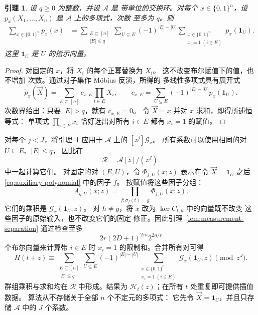 \documentclass[11pt,reqno]{amsart}
\numberwithin{equation}{section}
\newtheorem{lemma}[theorem]{引理}
\theoremstyle{definition}\newtheorem{definition}[theorem]{定义}
\theoremstyle{remark}\newtheorem{remark}[theorem]{注}
\renewcommand{\le}{\leqslant}
\renewcommand{\ge}{\geqslant}
\begin{document}
\begin{lemma}\label{lem:boolean-differences}
设 $q\ge0$ 为整数，并设 $\mathcal A$ 是
带单位的交换环。对每个 $x\in\{0,1\}^n$，设
$p_x(X_1,\ldots,X_n)$ 是 $\mathcal A$ 上的多项式，次数
至多为 $q$。则
\begin{align}
 \sum_{x\in\{0,1\}^n}p_x(x)
 &=\sum_{\substack{E\subseteq[n]\\|E|\le q}}
   \sum_{U\subseteq E}(-1)^{|E|-|U|}
   \sum_{\substack{x\in\{0,1\}^n\\x_i=1\ (i\in E)}}
                  p_x(\mathbf1_U).
\label{eq:boolean-differences}
\end{align}
这里 $\mathbf1_U$ 是 $U$ 的指示向量。
\end{lemma}
\begin{proof}
对固定的 $x$，将 $X_i$ 的每个正幂替换为 $X_i$。
这不改变布尔赋值下的值，也不增加
次数。通过对子集作 M\"obius 反演，所得的
多线性多项式具有展开式
\[
 \widetilde p_x(\vec{X})=\sum_{E\subseteq[n]}c_{x,E}\prod_{i\in E}X_i,
 \qquad
 c_{x,E}=\sum_{U\subseteq E}(-1)^{|E|-|U|}p_x(\mathbf1_U).
\]
次数界给出：只要 $|E|>q$，就有 $c_{x,E}=0$。
令 $\vec{X}=x$ 并对 $x$ 求和，即得所述恒等式：
单项式 $\prod_{i\in E}x_i$
恰好选出对所有 $i\in E$ 都有 $x_i=1$ 的赋值。
\end{proof}

对每个 $j<J$，将引理~\ref{lem:boolean-differences} 应用于
$\mathcal A$ 上的 $[z^j]\mathcal G_x$。
所有系数可以使用相同的对 $U\subseteq E$、$|E|\le q$，
因此在
\[
 \mathcal R=\mathcal A[z]/(z^J).
\]
中一起计算它们。
对固定的对 $(E,U)$，令 $\Phi_{f,U}(x;z)$ 表示在令 $\vec X=\mathbf1_U$ 之后
\eqref{eq:auxiliary-polynomial} 中的因子 $f$。
按赋值将这些因子分组：
\begin{equation}\label{eq:group-polynomial}
 A_{g,U}(x;z)=\prod_{f:\sigma_f(t)=g}\Phi_{f,U}(x;z).
\end{equation}
它们的乘积是 $\mathcal G_x(\mathbf1_U,z)$。
对 $h\ne g$，将 $x$ 改为 $\ker C_{t,h}$ 中的向量既不改变
这些因子的原始输入，也不改变它们的固定
修正。因此引理~\ref{lem:measurement-separation}
通过检查至多
\begin{equation}\label{eq:boolean-enumeration}
 2r(2D+1)^{2\tau n}2^{2n/r}
\end{equation}
个布尔向量来计算带 $i\in E$ 时 $x_i=1$ 的限制和。合并所有对可得
\begin{equation}\label{eq:full-taylor-sum}
 H(t+z)\equiv
 \sum_{\substack{E\subseteq[n]\\|E|\le q}}
 \sum_{U\subseteq E}(-1)^{|E|-|U|}
 \sum_{\substack{x\in\{0,1\}^n\\x_i=1\ (i\in E)}}
       \mathcal G_x(\mathbf1_U,z)\pmod{z^J}.
\end{equation}
群组乘积与求和均在 $\mathcal R$ 中形成。结果为
$\mathcal H_t(z)$；在所有 $t$ 处重复即可提供插值数据。
算法从不存储关于全部 $n$ 个不定元的多项式：
它先令 $\vec X=\mathbf1_U$，并且只存储 $\mathcal A$ 中的 $J$ 个系数。
\end{document}
